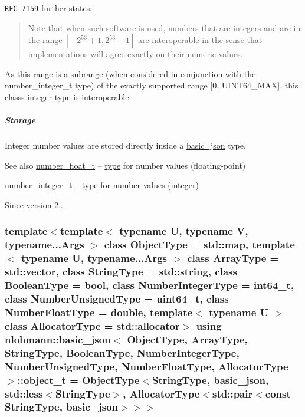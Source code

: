 \href{http://rfc7159.net/rfc7159}{\tt R\+FC 7159} further states\+: \begin{quote}
Note that when such software is used, numbers that are integers and are in the range $[-2^{53}+1, 2^{53}-1]$ are interoperable in the sense that implementations will agree exactly on their numeric values. \end{quote}


As this range is a subrange (when considered in conjunction with the number\+\_\+integer\+\_\+t type) of the exactly supported range \mbox{[}0, U\+I\+N\+T64\+\_\+\+M\+AX\mbox{]}, this class\textquotesingle{}s integer type is interoperable.

\subparagraph*{Storage}

Integer number values are stored directly inside a \hyperlink{a00025}{basic\+\_\+json} type.

\begin{DoxySeeAlso}{See also}
\hyperlink{a00025_a74a0013e847fdc574b48f931f0e757e1}{number\+\_\+float\+\_\+t} -- \hyperlink{a00025_a848cbae3bd3502ffbf738320bf5eb3aa}{type} for number values (floating-\/point)

\hyperlink{a00025_ac4b10b2364f26ce47bdb9a413ff04a59}{number\+\_\+integer\+\_\+t} -- \hyperlink{a00025_a848cbae3bd3502ffbf738320bf5eb3aa}{type} for number values (integer)
\end{DoxySeeAlso}
\begin{DoxySince}{Since}
version 2.. 
\end{DoxySince}
\subsubsection[{\texorpdfstring{object\+\_\+t}{object\_t}}]{\setlength{\rightskip}{0pt plus 5cm}template$<$template$<$ typename U, typename V, typename...\+Args $>$ class Object\+Type = std\+::map, template$<$ typename U, typename...\+Args $>$ class Array\+Type = std\+::vector, class String\+Type  = std\+::string, class Boolean\+Type  = bool, class Number\+Integer\+Type  = int64\+\_\+t, class Number\+Unsigned\+Type  = uint64\+\_\+t, class Number\+Float\+Type  = double, template$<$ typename U $>$ class Allocator\+Type = std\+::allocator$>$ using {\bf nlohmann\+::basic\+\_\+json}$<$ Object\+Type, Array\+Type, String\+Type, Boolean\+Type, Number\+Integer\+Type, Number\+Unsigned\+Type, Number\+Float\+Type, Allocator\+Type $>$\+::{\bf object\+\_\+t} =  Object\+Type$<$String\+Type, {\bf basic\+\_\+json}, std\+::less$<$String\+Type$>$, Allocator\+Type$<$std\+::pair$<$const String\+Type, {\bf basic\+\_\+json}$>$$>$$>$}\hypertarget{a00025_a0ac9894c9de8dc551cf2e5f1c605537f}{}\label{a00025_a0ac9894c9de8dc551cf2e5f1c605537f}


